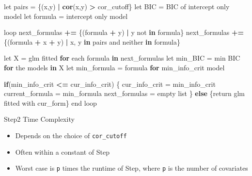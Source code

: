 \documentclass[ignorenonframetext,]{beamer}
\newenvironment{Shaded}{\begin{snugshade}}{\end{snugshade}}
\newcommand{\KeywordTok}[1]{\textcolor[rgb]{0.13,0.29,0.53}{\textbf{#1}}}
\newcommand{\StringTok}[1]{\textcolor[rgb]{0.31,0.60,0.02}{#1}}
\newcommand{\ControlFlowTok}[1]{\textcolor[rgb]{0.13,0.29,0.53}{\textbf{#1}}}
\newcommand{\OperatorTok}[1]{\textcolor[rgb]{0.81,0.36,0.00}{\textbf{#1}}}
\newcommand{\ErrorTok}[1]{\textcolor[rgb]{0.64,0.00,0.00}{\textbf{#1}}}
\newcommand{\NormalTok}[1]{#1}
\providecommand{\tightlist}{%
  \setlength{\itemsep}{0pt}\setlength{\parskip}{0pt}}
\begin{document}
\begin{frame}[fragile]{}

\begin{Shaded}
\begin{Highlighting}[]
\NormalTok{let pairs =}\StringTok{ }\NormalTok{\{(x,y) }\OperatorTok{|}\StringTok{ }\KeywordTok{cor}\NormalTok{(x,y) }\OperatorTok{>}\StringTok{ }\NormalTok{cor_cutoff\}}
\NormalTok{let BIC =}\StringTok{ }\NormalTok{BIC of intercept only model}
\NormalTok{let formula =}\StringTok{ }\NormalTok{intercept only model}

\NormalTok{loop}
\NormalTok{  next_formulas }\OperatorTok{+}\ErrorTok{=}\StringTok{ }\NormalTok{\{(formula }\OperatorTok{+}\StringTok{ }\NormalTok{y) }\OperatorTok{|}\StringTok{ }\NormalTok{y not }\ControlFlowTok{in}\NormalTok{ formula\}}
\NormalTok{  next_formulas }\OperatorTok{+}\ErrorTok{=}\StringTok{ }\NormalTok{\{(formula }\OperatorTok{+}\StringTok{ }\NormalTok{x }\OperatorTok{+}\StringTok{ }\NormalTok{y)}
    \OperatorTok{|}\StringTok{ }\NormalTok{x, y }\ControlFlowTok{in}\NormalTok{ pairs and neither }\ControlFlowTok{in}\NormalTok{ formula\}}

\NormalTok{    let X =}\StringTok{ }\NormalTok{glm fitted }\ControlFlowTok{for}\NormalTok{ each formula }\ControlFlowTok{in}\NormalTok{ next_formulas}
\NormalTok{    let min_BIC =}\StringTok{ }\NormalTok{min BIC }\ControlFlowTok{for}\NormalTok{ the models }\ControlFlowTok{in}\NormalTok{ X}
\NormalTok{    let min_formula =}\StringTok{ }\NormalTok{formula }\ControlFlowTok{for}\NormalTok{ min_info_crit model}

    \ControlFlowTok{if}\NormalTok{(min_info_crit }\OperatorTok{<=}\StringTok{ }\NormalTok{cur_info_crit) \{}
\NormalTok{        cur_info_crit =}\StringTok{ }\NormalTok{min_info_crit}
\NormalTok{        current_formula =}\StringTok{ }\NormalTok{min_formula}
\NormalTok{        next_formulas =}\StringTok{ }\NormalTok{empty list}
\NormalTok{  \} }\ControlFlowTok{else}\NormalTok{ \{return glm fitted with cur_form\}}
\NormalTok{end loop}
\end{Highlighting}
\end{Shaded}

\end{frame}

\begin{frame}[fragile]{Step2 Time Complexity}

\begin{itemize}
\tightlist
\item
  Depends on the choice of \texttt{cor\_cutoff}
\item
  Often within a constant of Step
\item
  Worst case is \texttt{p} times the runtime of Step, where \texttt{p}
  is the number of covariates
\end{itemize}

\end{frame}
\end{document}
